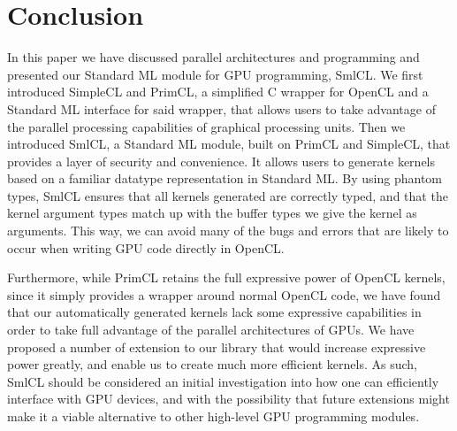 \section{Conclusion}

In this paper we have discussed parallel architectures and programming
and presented our Standard ML module for GPU programming, SmlCL. We
first introduced SimpleCL and PrimCL, a simplified C wrapper for
OpenCL and a Standard ML interface for said wrapper, that allows users
to take advantage of the parallel processing capabilities of graphical
processing units. Then we introduced SmlCL, a Standard ML module,
built on PrimCL and SimpleCL, that provides a layer of security and
convenience. It allows users to generate kernels based on a familiar
datatype representation in Standard ML. By using phantom types, SmlCL
ensures that all kernels generated are correctly typed, and that the
kernel argument types match up with the buffer types we give the
kernel as arguments. This way, we can avoid many of the bugs and
errors that are likely to occur when writing GPU code directly in
OpenCL.

Furthermore, while PrimCL retains the full expressive power of OpenCL
kernels, since it simply provides a wrapper around normal OpenCL code,
we have found that our automatically generated kernels lack some
expressive capabilities in order to take full advantage of the
parallel architectures of GPUs. We have proposed a number of extension
to our library that would increase expressive power greatly, and
enable us to create much more efficient kernels. As such, SmlCL should
be considered an initial investigation into how one can efficiently
interface with GPU devices, and with the possibility that future
extensions might make it a viable alternative to other high-level GPU
programming modules.
